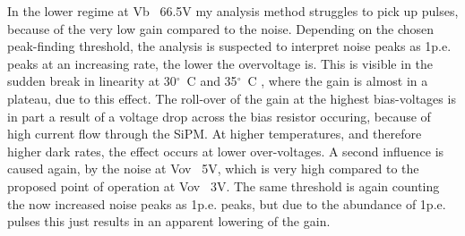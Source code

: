 \documentclass[12pt,article,type=msc,colorback,accentcolor=tud9c]{tudthesis}
\begin{document}
In the lower regime at Vb ~66.5V my analysis method struggles to pick up pulses, because of the very low gain compared to the noise. Depending on the chosen peak-finding threshold, the analysis is suspected to interpret noise peaks as 1p.e. peaks at an increasing rate, the lower the overvoltage is. This is visible in the sudden break in linearity at 30$^{\circ}$~C and 35$^{\circ}$~C , where the gain is almost in a plateau, due to this effect. The roll-over of the gain at the highest bias-voltages is in part a result of a voltage drop across the bias resistor occuring, because of high current flow through the SiPM. At higher temperatures, and therefore higher dark rates, the effect occurs at lower over-voltages. A second influence is caused again, by the noise at Vov ~5V, which is very high compared to the proposed point of operation at Vov ~3V. The same threshold is again counting the now increased noise peaks as 1p.e. peaks, but due to the abundance of 1p.e. pulses this just results in an apparent lowering of the gain.




\end{document}
